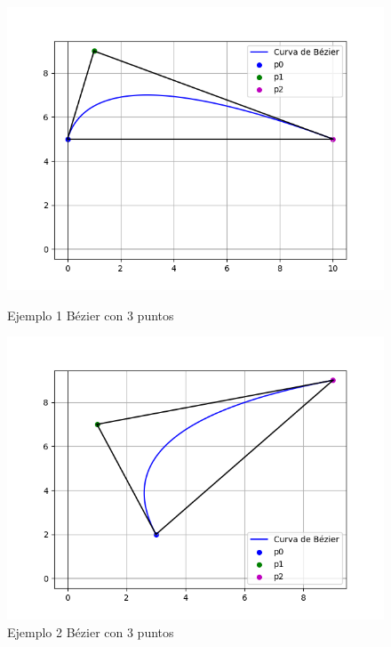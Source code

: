 \documentclass{article}
\begin{document}
\begin{figure}[H]
   \centering
    \begin{minipage}{0.45\textwidth}
        \centering
        \includegraphics[width=\textwidth]{imagenes/3b1.png}
        \caption{Ejemplo 1 Bézier con 3 puntos}
        \label{fig:grafico1}
    \end{minipage}
    \hfill
    \begin{minipage}{0.45\textwidth}
        \centering
        \includegraphics[width=\textwidth]{imagenes/3b2.png}
        \caption{Ejemplo 2 Bézier con 3 puntos}
        \label{fig:grafico2}
    \end{minipage}
\begin{minipage}{0.45\textwidth}

\end{minipage}
\end{figure}
\end{document}
